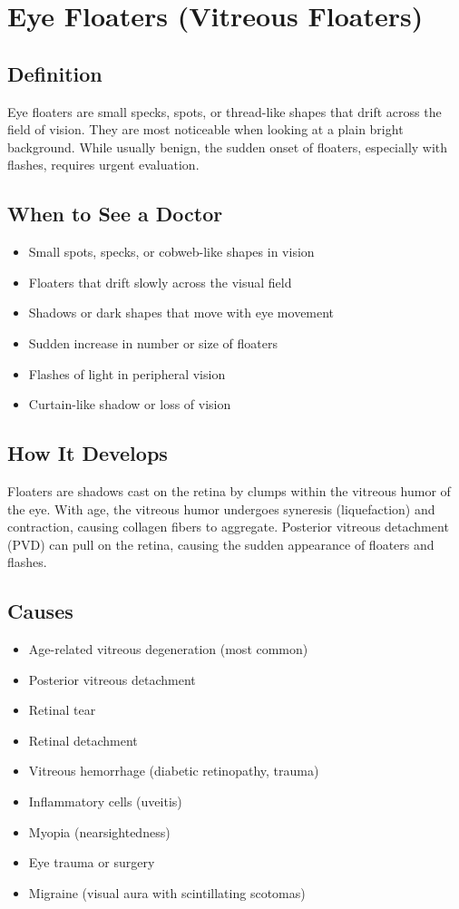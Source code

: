 \chapter{Eye Floaters (Vitreous Floaters)}

\section*{Definition}
Eye floaters are small specks, spots, or thread-like shapes that drift across the field of vision. They are most noticeable when looking at a plain bright background. While usually benign, the sudden onset of floaters, especially with flashes, requires urgent evaluation.

\section*{When to See a Doctor}
\begin{itemize}
\item Small spots, specks, or cobweb-like shapes in vision
\item Floaters that drift slowly across the visual field
\item Shadows or dark shapes that move with eye movement
\item Sudden increase in number or size of floaters
\item Flashes of light in peripheral vision
\item Curtain-like shadow or loss of vision
\end{itemize}

\section*{How It Develops}
Floaters are shadows cast on the retina by clumps within the vitreous humor of the eye. With age, the vitreous humor undergoes syneresis (liquefaction) and contraction, causing collagen fibers to aggregate. Posterior vitreous detachment (PVD) can pull on the retina, causing the sudden appearance of floaters and flashes.

\section*{Causes}
\begin{itemize}
\item Age-related vitreous degeneration (most common)
\item Posterior vitreous detachment
\item Retinal tear
\item Retinal detachment
\item Vitreous hemorrhage (diabetic retinopathy, trauma)
\item Inflammatory cells (uveitis)
\item Myopia (nearsightedness)
\item Eye trauma or surgery
\item Migraine (visual aura with scintillating scotomas)
\end{itemize}

